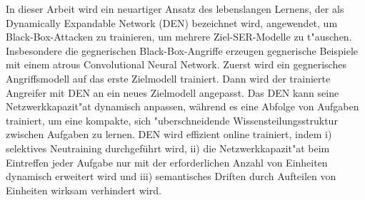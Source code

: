 In dieser Arbeit wird ein neuartiger Ansatz des lebenslangen Lernens, der als Dynamically Expandable Network (DEN) bezeichnet wird, angewendet, um Black-Box-Attacken zu trainieren, um mehrere Ziel-SER-Modelle zu t"auschen. Insbesondere die gegnerischen Black-Box-Angriffe erzeugen gegnerische Beispiele mit einem atrous Convolutional Neural Network. Zuerst wird ein gegnerisches Angriffsmodell auf das erste Zielmodell trainiert. Dann wird der trainierte Angreifer mit DEN an ein neues Zielmodell angepasst. Das DEN kann seine Netzwerkkapazit"at dynamisch anpassen, während es eine Abfolge von Aufgaben trainiert, um eine kompakte, sich "uberschneidende Wissensteilungsstruktur zwischen Aufgaben zu lernen. DEN wird effizient online trainiert, indem i) selektives Neutraining durchgeführt wird, ii) die Netzwerkkapazit"at beim Eintreffen jeder Aufgabe nur mit der erforderlichen Anzahl von Einheiten dynamisch erweitert wird und iii) semantisches Driften durch Aufteilen von Einheiten wirksam verhindert wird.